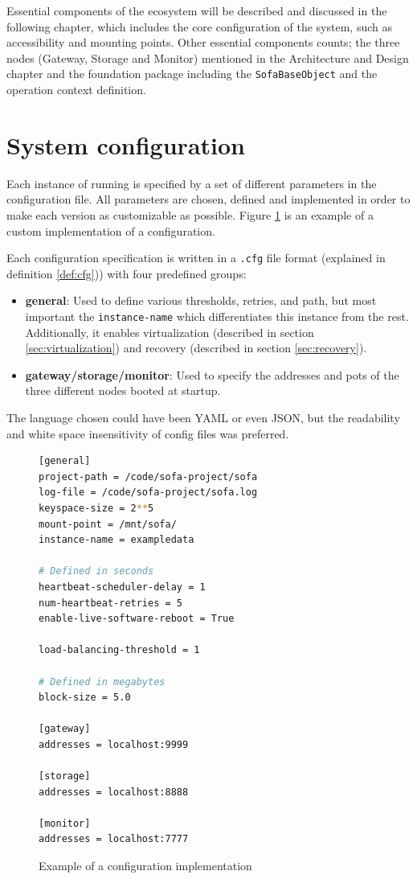 Essential components of the \CodeName ecosystem will be described and discussed in the following chapter, which includes the core configuration of the system, such as accessibility and mounting points. Other essential components counts; the three nodes (Gateway, Storage and Monitor) mentioned in the Architecture and Design chapter and the foundation package including the \texttt{SofaBaseObject} and the operation context definition.

\section{System configuration} \label{sec:configuration}
Each instance of \CodeName running is specified by a set of different parameters in the configuration file. All parameters are chosen, defined and implemented in order to make each version as customizable as possible. Figure \ref{fig:cfg_example} is an example of a custom implementation of a \CodeName configuration.
\newline

Each configuration specification is written in a \texttt{.cfg} file format (explained in definition \ref{def:cfg})) with four predefined groups:
\begin{itemize}
	\item \textbf{general}: Used to define various thresholds, retries, and path, but most important the \texttt{instance-name} which differentiates this instance from the rest. Additionally, it enables virtualization (described in section \ref{sec:virtualization}) and recovery (described in section \ref{sec:recovery}).
	\item \textbf{gateway/storage/monitor}: Used to specify the addresses and pots of the three different nodes booted at startup.
\end{itemize}

The language chosen could have been YAML \cite{PageYaml} or even JSON, but the readability and white space insensitivity of config files was preferred.

\begin{figure}
\vspace*{4mm}
\begin{lstlisting}[language=bash, frame=single, basicstyle=\ttfamily\tiny, otherkeywords={[,],=}, numbers=none, deletekeywords=enable]
[general]
project-path = /code/sofa-project/sofa
log-file = /code/sofa-project/sofa.log
keyspace-size = 2**5
mount-point = /mnt/sofa/
instance-name = exampledata

# Defined in seconds
heartbeat-scheduler-delay = 1
num-heartbeat-retries = 5
enable-live-software-reboot = True

load-balancing-threshold = 1

# Defined in megabytes
block-size = 5.0

[gateway]
addresses = localhost:9999

[storage]
addresses = localhost:8888

[monitor]
addresses = localhost:7777
\end{lstlisting}

\caption{Example of a \CodeName configuration implementation \label{fig:cfg_example}}
\end{figure}

